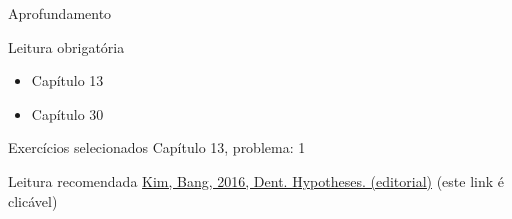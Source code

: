\documentclass{beamer}
\begin{document}
\begin{frame}{Aprofundamento}
  \begin{block}{Leitura obrigatória}
    \begin{itemize}
    \item Capítulo 13
    \item Capítulo 30
    \end{itemize}
  \end{block}
  \begin{block}{Exercícios selecionados}
    \small
    Capítulo 13, problema: 1
  \end{block}
  \begin{block}{Leitura recomendada}
    \small
    \href{https://www.ncbi.nlm.nih.gov/pmc/articles/PMC5042133/}{Kim, Bang, 2016, Dent. Hypotheses. (editorial)} {\tiny (este link é clicável)}
  \end{block}
\end{frame}
\end{document}
